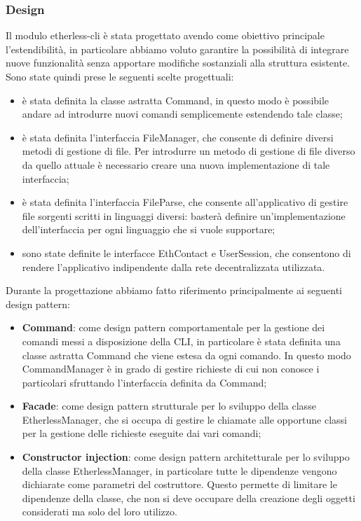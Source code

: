 \subsubsection{Design}
Il modulo etherless-cli è stata progettato avendo come obiettivo principale l'estendibilità, in particolare abbiamo voluto garantire la possibilità di integrare nuove funzionalità senza apportare modifiche sostanziali alla struttura esistente. Sono state quindi prese le seguenti scelte progettuali: 
\begin{itemize}
	\item è stata definita la classe astratta Command, in questo modo è possibile andare ad introdurre nuovi comandi semplicemente estendendo tale classe;  
	\item è stata definita l'interfaccia FileManager, che consente di definire diversi metodi di gestione di file. Per introdurre un metodo di gestione di file diverso da quello attuale è necessario creare una nuova implementazione di tale interfaccia; 
	\item è stata definita l'interfaccia FileParse, che consente all'applicativo di gestire file sorgenti scritti in linguaggi diversi: basterà definire un'implementazione dell'interfaccia per ogni linguaggio che si vuole supportare; 
	\item sono state definite le interfacce EthContact e UserSession, che consentono di rendere l'applicativo indipendente dalla rete decentralizzata utilizzata. 
\end{itemize}

Durante la progettazione abbiamo fatto riferimento principalmente ai seguenti design pattern:
\begin{itemize}
	\item \textbf{Command}: come design pattern comportamentale per la gestione dei comandi messi a disposizione della CLI, in particolare è stata definita una classe astratta Command che viene estesa da ogni comando. In questo modo CommandManager è in grado di gestire richieste di cui non conosce i particolari sfruttando l'interfaccia definita da Command;

	\item \textbf{Facade}: come design pattern strutturale per lo sviluppo della classe EtherlessManager, che si occupa di gestire le chiamate alle opportune classi per la gestione delle richieste eseguite dai vari comandi;

	\item \textbf{Constructor injection}: come design pattern architetturale per lo sviluppo della classe EtherlessManager, in particolare tutte le dipendenze vengono dichiarate come parametri del costruttore. Questo permette di limitare le dipendenze della classe, che non si deve occupare della creazione degli oggetti considerati ma solo del loro utilizzo. 
\end{itemize}

